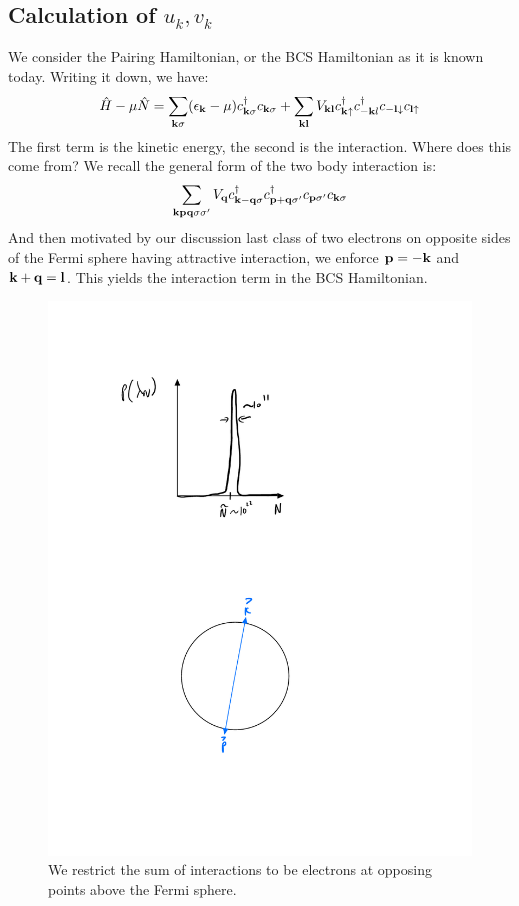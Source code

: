 \subsection{Calculation of $u_k, v_k$}
We consider the Pairing Hamiltonian, or the BCS Hamiltonian as it is known today. Writing it down, we have:
\begin{equation}
    \hat{H} - \mu \hat{N} = \sum_{\mathbf{k}\sigma}(\epsilon_{\mathbf{k}} - \mu)c^{\dagger}_{\mathbf{k}\sigma}c_{\mathbf{k}\sigma} + \sum_{\mathbf{k}\mathbf{l}}V_{\mathbf{k}\mathbf{l}}c^\dagger_{\mathbf{k}\uparrow}c^\dagger_{-\mathbf{k}l}c_{-\mathbf{l}\downarrow}c_{\mathbf{l}\uparrow}
\end{equation}
The first term is the kinetic energy, the second is the interaction. Where does this come from? We recall the general form of the two body interaction is:
\begin{align*}
    \sum_{\mathbf{kpq}\sigma\sigma'} V_{\mathbf{q}}c^\dagger_{\mathbf{k} - \mathbf{q}\sigma}c^\dagger_{\mathbf{p} + \mathbf{q}\sigma'}c_{\mathbf{p}\sigma'}c_{\mathbf{k}\sigma}
\end{align*}
And then motivated by our discussion last class of two electrons on opposite sides of the Fermi sphere having attractive interaction, we enforce $\mathbf{p} = -\mathbf{k}$ and $\mathbf{k} + \mathbf{q} = \mathbf{l}$. This yields the interaction term in the BCS Hamiltonian.

\begin{figure}[htbp]
    \centering
    \includegraphics[scale=0.7]{Images/fig-fermisphereopposingelectrons.pdf}
    \caption{We restrict the sum of interactions to be electrons at opposing points above the Fermi sphere.}
    \label{fig-fermisphereopposingelectrons}
\end{figure}

